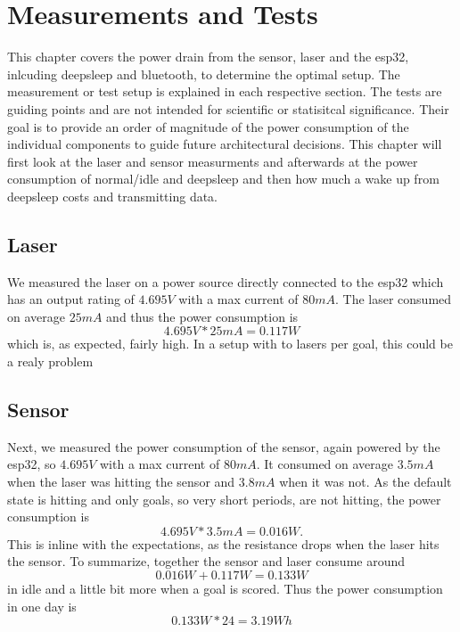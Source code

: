 \section{Measurements and Tests}
This chapter covers the power drain from the sensor, laser and the esp32, inlcuding deepsleep and bluetooth, to determine the optimal setup. The measurement or test setup is explained in each respective section. The tests are guiding points and are not intended for scientific or statisitcal significance. Their goal is to provide an order of magnitude of the power consumption of the individual components to guide future architectural decisions. This chapter will first look at the laser and sensor measurments and afterwards at the power consumption of normal/idle and deepsleep and then how much a wake up from deepsleep costs and transmitting data.


\subsection{Laser}
We measured the laser on a power source directly connected to the esp32 which has an output rating of $4.695V$ with a max current of $80mA$. The laser consumed on average $25mA$ and thus the power consumption is
\begin{equation*}
    4.695V * 25mA = 0.117W
\end{equation*}
which is, as expected, fairly high. In a setup with to lasers per goal, this could be a realy problem


\subsection{Sensor}
Next, we measured the power consumption of the sensor, again powered by the esp32, so $4.695V$ with a max current of $80mA$. It consumed on average $3.5mA$ when the laser was hitting the sensor and $3.8mA$ when it was not. As the default state is hitting and only goals, so very short periods, are not hitting, the power consumption is
  \begin{equation*}
      4.695V * 3.5mA = 0.016W.
    \end{equation*}
This is inline with the expectations, as the resistance drops when the laser hits the sensor. 
To summarize, together the sensor and laser consume around  
\begin{equation*}
    0.016W + 0.117W = 0.133W
  \end{equation*}
in idle and a little bit more when a goal is scored. Thus the power consumption in one day is
\begin{equation*}
    0.133W * 24 = 3.19Wh
\end{equation*}

